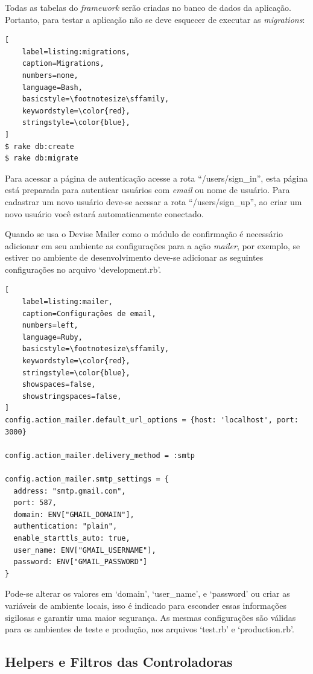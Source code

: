 Todas as tabelas do \textit{framework} serão criadas no banco de dados da aplicação. Portanto, para testar a aplicação não se deve esquecer de executar as \textit{migrations}:

\begin{lstlisting}[
    label=listing:migrations,
    caption=Migrations,
    numbers=none,
    language=Bash,
    basicstyle=\footnotesize\sffamily,
    keywordstyle=\color{red},
    stringstyle=\color{blue},
]
$ rake db:create
$ rake db:migrate
\end{lstlisting}

Para acessar a página de autenticação acesse a rota ``/users/sign\_in'', esta página está preparada para autenticar usuários com \textit{email} ou nome de usuário. Para cadastrar um novo usuário deve-se acessar a rota ``/users/sign\_up'', ao criar um novo usuário você estará automaticamente conectado.

Quando se usa o Devise Mailer como o módulo de confirmação é necessário adicionar em seu ambiente as configurações para a ação \textit{mailer}, por exemplo, se estiver no ambiente de desenvolvimento deve-se adicionar as seguintes configurações no arquivo `development.rb'.

\begin{lstlisting}[
    label=listing:mailer,
    caption=Configurações de email,
    numbers=left,
    language=Ruby,
    basicstyle=\footnotesize\sffamily,
    keywordstyle=\color{red},
    stringstyle=\color{blue},
    showspaces=false,
    showstringspaces=false,
]
config.action_mailer.default_url_options = {host: 'localhost', port: 3000}

config.action_mailer.delivery_method = :smtp

config.action_mailer.smtp_settings = {
  address: "smtp.gmail.com",
  port: 587,
  domain: ENV["GMAIL_DOMAIN"],
  authentication: "plain",
  enable_starttls_auto: true,
  user_name: ENV["GMAIL_USERNAME"],
  password: ENV["GMAIL_PASSWORD"]
}
\end{lstlisting}

Pode-se alterar os valores em `domain', `user\_name', e `password' ou criar as variáveis de ambiente locais, isso é indicado para esconder essas informações sigilosas e garantir uma maior segurança. As mesmas configurações são válidas para os ambientes de teste e produção, nos arquivos `test.rb' e `production.rb'.

\subsection{Helpers e Filtros das Controladoras}

